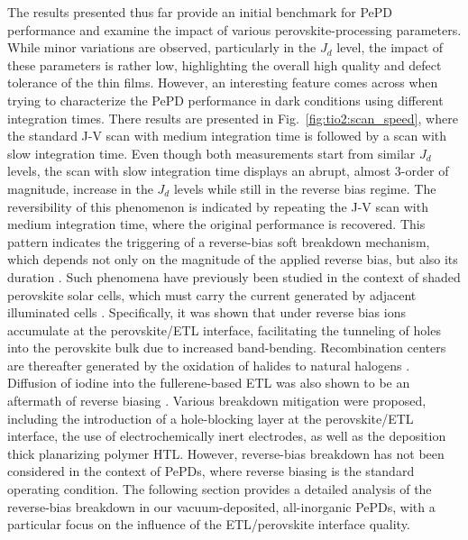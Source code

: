 The results presented thus far provide an initial benchmark for PePD performance and examine the impact of various perovskite-processing parameters. While minor variations are observed, particularly in the $J_d$ level, the impact of these parameters is rather low, highlighting the overall high quality and defect tolerance of the  thin films. However, an interesting feature comes across when trying to characterize the PePD performance in dark conditions using different integration times. There results are presented in Fig.~\ref{fig:tio2:scan_speed}, where the standard J-V scan with medium integration time is followed by a scan with slow integration time. Even though both measurements start from similar $J_d$ levels, the scan with slow integration time displays an abrupt, almost 3-order of magnitude, increase in the $J_d$ levels while still in the reverse bias regime. The reversibility of this phenomenon is indicated by repeating the J-V scan with medium integration time, where the original performance is recovered. This pattern indicates the triggering of a reverse-bias soft breakdown mechanism, which depends not only on the magnitude of the applied reverse bias, but also its duration \cite{Bertoluzzi2021IncorporatingBias}. Such phenomena have previously been studied in the context of shaded perovskite solar cells, which must carry the current generated by adjacent illuminated cells \cite{Jiang2024ImprovedElectrodes, Ren2024MobileCells, Li2024BarrierBias,Gould2021In-OperandoBias,Razera2020Instability,Bertoluzzi2021IncorporatingBias,Wang2023PerovskiteDegradation,Bowring2018ReverseCells, Ni2021EvolutionIllumination}. Specifically, it was shown that under reverse bias ions accumulate at the perovskite/ETL interface, facilitating the tunneling of holes into the perovskite bulk due to increased band-bending. Recombination centers are thereafter generated by the oxidation of halides to natural halogens \cite{Bertoluzzi2021IncorporatingBias}. Diffusion of iodine into the fullerene-based ETL was also shown to be an aftermath of reverse biasing \cite{Razera2020Instability}. Various breakdown mitigation were proposed, including the introduction of a hole-blocking layer at the perovskite/ETL interface, the use of electrochemically inert electrodes, as well as the deposition thick planarizing polymer HTL. However, reverse-bias breakdown has not been considered in the context of PePDs, where reverse biasing is the standard operating condition. The following section provides a detailed analysis of the reverse-bias breakdown in our vacuum-deposited, all-inorganic PePDs, with a particular focus on the influence of the ETL/perovskite interface quality.



